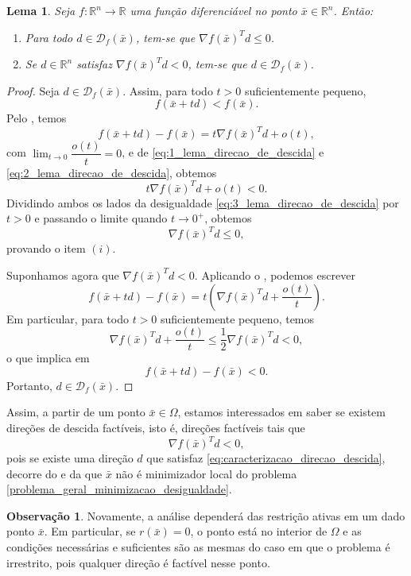 \documentclass[12pt,a4paper]{scrartcl}
\def\RR{\mathds{R}}
\def\xbar{\bar{x}}
\newtheorem{lema}{Lema}
\theoremstyle{definition}%
\newtheorem{obs}{Observação}
\begin{document}
\begin{lema} \label{lema:direcao_de_descida}
Seja $f:\RR^{n} \rightarrow \RR$ uma função diferenciável no ponto $\xbar \in \RR^{n}$. Então:
\begin{enumerate}
	\item[(i)] Para todo $d \in \mathcal{D}_{f}(\xbar)$, tem-se que $\nabla f(\xbar)^{T}d \leq 0$.

	\item[(ii)] Se $d\in \RR^{n}$ satisfaz $\nabla f(\xbar)^{T}d < 0$, tem-se que $d \in \mathcal{D}_{f}(\xbar)$.
\end{enumerate}	
\end{lema}
\begin{proof}
Seja $d \in \mathcal{D}_{f}(\xbar)$. Assim, para todo $t>0$ suficientemente pequeno, 
\[ \label{eq:1_lema_direcao_de_descida}
f(\xbar + td) < f(\xbar).
\]
Pelo , temos
\[ \label{eq:2_lema_direcao_de_descida}
f(\xbar + td) - f(\xbar) = t\nabla f(\xbar)^{T} d + o(t),
\] 
com $\displaystyle\lim_{t\rightarrow 0} \dfrac{o(t)}{t} =0$, e de \eqref{eq:1_lema_direcao_de_descida} e \eqref{eq:2_lema_direcao_de_descida}, obtemos
\[ \label{eq:3_lema_direcao_de_descida}
t\nabla f(\xbar)^{T}d + o(t) < 0.
\]
Dividindo ambos os lados da desigualdade \eqref{eq:3_lema_direcao_de_descida} por $t>0$ e passando o limite quando $t \rightarrow 0^{+}$, obtemos
\[
\nabla f(\xbar)^{T}d \leq 0,
\]
provando o item $(i)$.

Suponhamos agora que $\nabla f(\xbar)^{T}d <0$. Aplicando o , podemos escrever
\[
f(\xbar + td) - f(\xbar) = t\left( \nabla f(\xbar)^{T}d + \dfrac{o(t)}{t} \right) .
\]
Em particular, para todo $t>0$ suficientemente pequeno, temos
\[
\nabla f(\xbar)^{T}d + \dfrac{o(t)}{t} \leq \dfrac{1}{2} \nabla f(\xbar)^{T}d <0,
\]
o que implica em
\[
f(\xbar + td) - f(\xbar) <0.
\]
Portanto, $d \in \mathcal{D}_{f}(\xbar)$.
\end{proof}

Assim, a partir de um ponto $\xbar \in \Omega$, estamos interessados em saber se existem direções de descida factíveis, isto é, direções factíveis tais que
\[ \label{eq:caracterizacao_direcao_descida}
\nabla f(\xbar)^{T}d < 0,
\]
pois se existe uma direção $d$ que satisfaz \eqref{eq:caracterizacao_direcao_descida}, decorre do  e da  que $\xbar$ não é minimizador local do problema \eqref{problema_geral_minimizacao_desigualdade}.

\begin{obs}
Novamente, a análise dependerá das restrição ativas em um dado ponto $\xbar$. Em particular, se $r(\xbar) =0$, o ponto está no interior de $\Omega$ e as condições necessárias e suficientes são as mesmas do caso em que o problema é irrestrito, pois qualquer direção é factível nesse ponto.
\end{obs}
\end{document}
